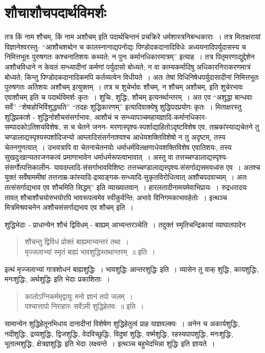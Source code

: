 {\section*{शौचाशौचपदार्थविमर्शः}

तत्र किं नाम शौचम्, किं नाम अशौचम् इति पदार्थचिन्तनं प्रचक्रिरे धर्मशास्त्रनिबन्धकाराः~। तत्र मिताक्षरायां विज्ञानेश्वरस्तु- “आशौचशब्देन च कालस्नानाद्यपनोद्यः पिण्डोदकदानादिविधेः अध्ययनादिपर्युदासस्य च निमित्तभूतः पुरुषगतः कश्चनातिशयः कथ्यते; न पुनः कर्मानधिकारमात्रम्” इत्याह~। तत्र पितृमरणाद्युद्देशेन अशौचविधाने न केवलं सन्ध्यादीनां कर्मणां पर्युदासो बोध्यते; न वा काम्यकर्मादिषु अधिकारनिराकरणमात्रं बोध्यते; किन्तु पिण्डोदकदानादिकमपि कर्तव्यत्वेन विधीयते~। अतः तेषां विधिनिषेधपर्युदासादीनां निमित्तभूतः पुरुषगतः अतिशयः अशौचम् इत्युक्तम्~। तत्र च शुचेर्भावः शौचम्, न शौचम् अशौचम्, इति शुचेरभावः एवाशौचम् इति च पदार्थविमर्शः कृतः~। शुचिः, शुद्धिः, शौचम् इत्यनर्थान्तरम्~। अत एव “अशुद्धा बान्धवाः सर्वे” “शेषाहोभिर्विशुद्ध्यति” “तदहः शुद्धिकारणम्” इत्यादिवाक्येषु शुद्धिपदप्रयोगः कृतः~। मिताक्षरस्तु शुद्धिप्रकाशे - शुद्धिर्नाशौचसंसर्गाभावः, आशौचं च सन्ध्यापञ्चमहायज्ञादि-कर्मानधिकार-सम्पादकोऽतिशयविशेषः, स च चेतने जनन- मरणास्पृश्य-स्पर्शाद्याहितोऽदृष्टविशेष एव, ताम्रकांस्याद्यचेतने तु चण्डालाद्यस्पृश्यस्पर्शादिजन्यो आम्लादिसंसर्गनाश्यश्च आधेयशक्तिविशेषो न तु अदृष्टम्, तस्य चेतनगुणत्वात्~। उभयत्रापि वा चेतनाचेतनयोः धर्माधर्मविलक्षणाधेयशक्तिविशेष एवातिशयः, तस्य सुखदुःखान्यतरजनकत्वं प्रमाणाभावेन धर्माधर्मरूपत्वाभावात्~। अस्तु वा तत्तच्चण्डालाद्यस्पृश्य-संसर्गोत्पत्तिकालीन- यावदम्लादि-संसर्गाभावविशिष्टः तत्तच्चण्डालाद्यस्पृश्य-संसर्गाद्यसमयध्वंस एव~। अतश्च युक्तं सर्वेषाममीषां तत्तत्ताम्र-कांस्यादि-द्रव्याङ्गक-सन्ध्यादि-सुकृतविरोधित्वात् अशौचपदवाच्यम्~। अतः तत्संसर्गाद्यभाव एव शौचमिति सिद्धम्” इति व्याख्यातवान्~। हारलतादीनामयमेवाभिप्रायः~। रुद्रधरादयः तावत् शौचाशौचयोरुभयोरपि भावरूपत्वमेव स्वीकुर्वन्ति; अभावे विनिगमकाभावहेतोः~।  इत्थञ्च मित्रमिश्रवचनेन अशौचसंसर्गाद्यभाव एव शौचम् इति~। 

शुद्धिभेदाः - प्राधान्येन शौचं द्विविधम् - बाह्यम् आभ्यन्तरञ्चेति~। तदुक्तं स्मृतिचन्द्रिकायां व्याघातपादेन 

\begin{verse}
शौचन्तु द्विविधं प्रोक्तं बाह्यमाभ्यन्तरं तथा~। \\
मृज्जलाभ्यां स्मृतं बाह्यं भावशुद्धिस्तथान्तरम्~॥ इति~। 
\end{verse}
इत्थं मृज्जलाभ्यां गात्रशोधनं बाह्यशुद्धिः~। भावशुद्धिः आन्तरशुद्धिः इति~। व्यासेन तु वाक् शुद्धिः, कायशुद्धिः, मनःशुद्धिः, अर्थशुद्धिः इति भेदाः प्रकाशिताः~। 
\begin{verse}
कालोऽग्निकर्ममृद्वायुः मनो ज्ञानं तपो जलम्~। \\
पश्चात्तापो निराहारः सर्वेऽमी शुद्धिहेतवः~॥ इति~। 
\end{verse}
सामान्येन शुद्धिहेतूनभिधाय दानादीनां विशेषेण शुद्धिहेतुत्वं प्राह याज्ञवल्क्यः~। अनेन च अकार्यशुद्धिः, नदीशुद्धिः, द्रव्यशुद्धिः, द्विजशुद्धिः, वेदविच्छुद्धिः, विदुषां शुद्धिः, वर्ष्मशुद्धिः, रहस्यपापशुद्धिः, मनःशुद्धिः, भूतात्मशुद्धिः, क्षेत्रज्ञशुद्धिः इति भेदाः लक्ष्यन्ते~।  इत्थञ्च बहुभेदभिन्ना शुद्धिः इति ज्ञायते~। 

}
